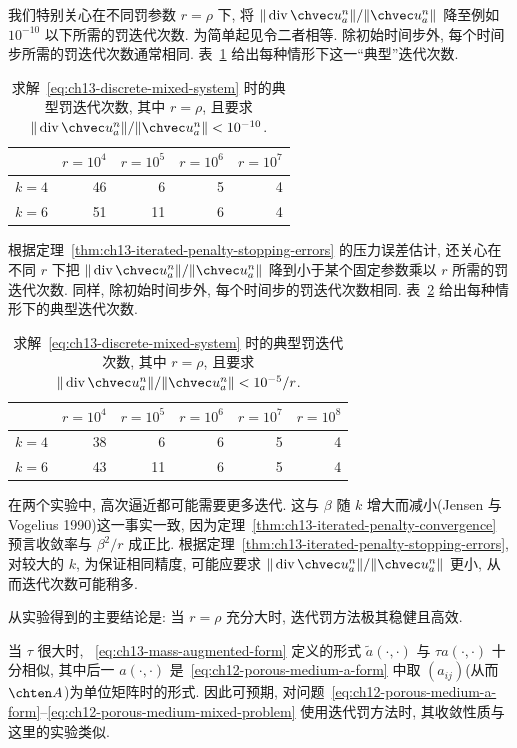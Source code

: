 我们特别关心在不同罚参数 $r=\rho$ 下, 将 $\|\operatorname{div}\chvec u_a^n\|/\|\chvec u_a^n\|$ 降至例如 $10^{-10}$ 以下所需的罚迭代次数. 为简单起见令二者相等. 除初始时间步外, 每个时间步所需的罚迭代次数通常相同. 表~\ref{tab:ch13-velocity-penalty-iterations} 给出每种情形下这一``典型''迭代次数.

\begin{table}[htbp]
\centering
\caption{求解~\eqref{eq:ch13-discrete-mixed-system} 时的典型罚迭代次数, 其中 $r=\rho$, 且要求 $\|\operatorname{div}\chvec u_a^n\|/\|\chvec u_a^n\|<10^{-10}$.}
\label{tab:ch13-velocity-penalty-iterations}
\begin{tabular}{c|rrrr}
& $r=10^4$ & $r=10^5$ & $r=10^6$ & $r=10^7$\\
\hline
$k=4$ & 46 & 6 & 5 & 4\\
$k=6$ & 51 & 11 & 6 & 4
\end{tabular}
\end{table}

根据定理~\ref{thm:ch13-iterated-penalty-stopping-errors} 的压力误差估计, 还关心在不同 $r$ 下把 $\|\operatorname{div}\chvec u_a^n\|/\|\chvec u_a^n\|$ 降到小于某个固定参数乘以 $r$ 所需的罚迭代次数. 同样, 除初始时间步外, 每个时间步的罚迭代次数相同. 表~\ref{tab:ch13-pressure-penalty-iterations} 给出每种情形下的典型迭代次数.

\begin{table}[htbp]
\centering
\caption{求解~\eqref{eq:ch13-discrete-mixed-system} 时的典型罚迭代次数, 其中 $r=\rho$, 且要求 $\|\operatorname{div}\chvec u_a^n\|/\|\chvec u_a^n\|<10^{-5}/r$.}
\label{tab:ch13-pressure-penalty-iterations}
\begin{tabular}{c|rrrrr}
& $r=10^4$ & $r=10^5$ & $r=10^6$ & $r=10^7$ & $r=10^8$\\
\hline
$k=4$ & 38 & 6 & 6 & 5 & 4\\
$k=6$ & 43 & 11 & 6 & 5 & 4
\end{tabular}
\end{table}

在两个实验中, 高次逼近都可能需要更多迭代. 这与 $\beta$ 随 $k$ 增大而减小(Jensen 与 Vogelius 1990)这一事实一致, 因为定理~\ref{thm:ch13-iterated-penalty-convergence} 预言收敛率与 $\beta^2/r$ 成正比. 根据定理~\ref{thm:ch13-iterated-penalty-stopping-errors}, 对较大的 $k$, 为保证相同精度, 可能应要求 $\|\operatorname{div}\chvec u_a^n\|/\|\chvec u_a^n\|$ 更小, 从而迭代次数可能稍多.

从实验得到的主要结论是: 当 $r=\rho$ 充分大时, 迭代罚方法极其稳健且高效.

\begin{Remark}
\label{rem:ch13-jeffrey-hamel-scalar-elliptic-analogy}
当 $\tau$ 很大时, ~\eqref{eq:ch13-mass-augmented-form} 定义的形式 $\widetilde a(\cdot,\cdot)$ 与 $\tau a(\cdot,\cdot)$ 十分相似, 其中后一 $a(\cdot,\cdot)$ 是~\eqref{eq:ch12-porous-medium-a-form} 中取 $(a_{ij})$(从而 $\chten A$)为单位矩阵时的形式. 因此可预期, 对问题~\eqref{eq:ch12-porous-medium-a-form}--\eqref{eq:ch12-porous-medium-mixed-problem} 使用迭代罚方法时, 其收敛性质与这里的实验类似.
\end{Remark}
